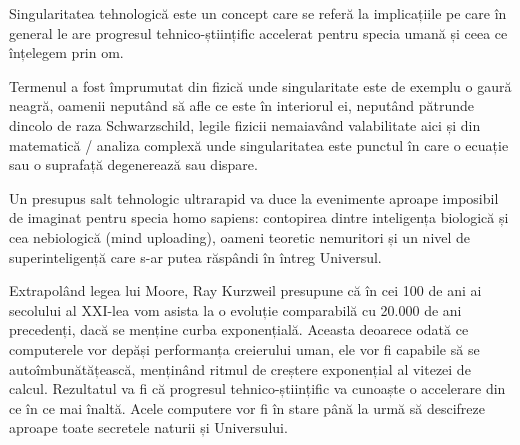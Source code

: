 Singularitatea tehnologică este un concept care se referă la implicațiile pe care în general le are progresul tehnico-științific accelerat pentru specia umană și ceea ce înțelegem prin om.

Termenul a fost împrumutat din fizică unde singularitate este de exemplu o gaură neagră, oamenii neputând să afle ce este în interiorul ei, neputând pătrunde dincolo de raza Schwarzschild, legile fizicii nemaiavând valabilitate aici și din  matematică / analiza complexă unde singularitatea este punctul în care o ecuație sau o suprafață degenerează sau dispare.

Un presupus salt tehnologic ultrarapid va duce la evenimente aproape imposibil de imaginat pentru specia homo sapiens: contopirea dintre inteligența biologică și cea nebiologică (mind uploading), oameni teoretic nemuritori și un nivel de superinteligență care s-ar putea răspândi în întreg Universul. 

Extrapolând legea lui Moore, Ray Kurzweil presupune că în cei 100 de ani ai secolului al XXI-lea vom asista la o evoluție comparabilă cu 20.000 de ani precedenți, dacă se menține curba exponențială. Aceasta deoarece odată ce computerele vor depăși performanța creierului uman, ele vor fi capabile să se autoîmbunătățească, menținând ritmul de creștere exponențial al vitezei de calcul. Rezultatul va fi că progresul tehnico-științific va cunoaște o accelerare din ce în ce mai înaltă. Acele computere vor fi în stare până la urmă să descifreze aproape toate secretele naturii și Universului.


